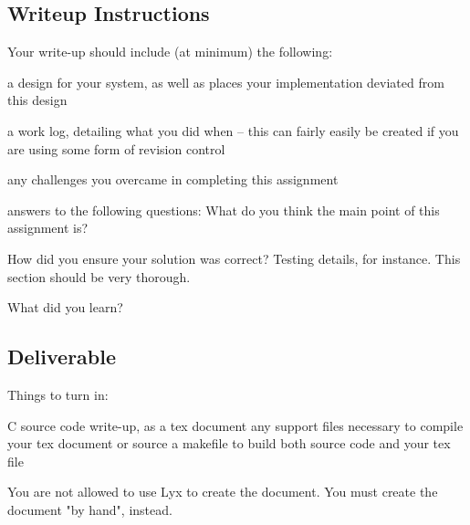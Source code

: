 \documentclass[letterpaper,10pt]{article}
\begin{document}
\subsection*{Writeup Instructions}

Your write-up should include (at minimum) the following:

    a design for your system, as well as places your implementation deviated
    from this design

    a work log, detailing what you did when -- this can fairly easily be
    created if you are using some form of revision control

    any challenges you overcame in completing this assignment

    answers to the following questions:
        What do you think the main point of this assignment is?

        How did you ensure your solution was correct? Testing details, for
        instance. This section should be very thorough.

        What did you learn?

\subsection*{Deliverable}

Things to turn in:

    C source code
    write-up, as a tex document
    any support files necessary to compile your tex document or source
    a makefile to build both source code and your tex file

You are not allowed to use Lyx to create the document. You must create the
document "by hand", instead.
\end{document}

